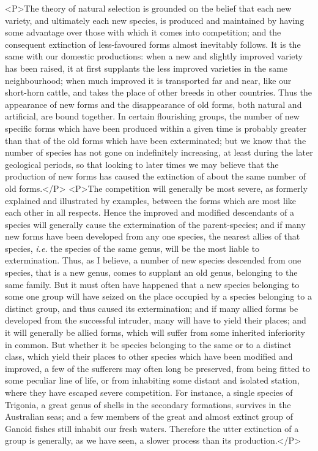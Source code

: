 <P>The theory of natural selection is grounded on the belief that each new variety, and ultimately each new species, is produced and maintained by having some advantage over those with which it comes into competition; and the consequent extinction of less-favoured forms almost inevitably follows.  It is the same with our domestic productions: when a new and slightly improved variety has been raised, it at first supplants the less improved varieties in the same neighbourhood; when much improved it is transported far and near, like our short-horn cattle, and takes the place of other breeds in other countries. Thus the appearance of new forms and the disappearance of old forms, both natural and artificial, are bound together. In certain flourishing groups, the number of new specific forms which have been produced within a given time is probably greater than that of the old forms which have been exterminated; but we know that the number of species has not gone on indefinitely increasing, at least during the later geological periods, so that looking to later times we may believe that the production of new forms has caused the extinction of about the same number of old forms.</P>
<P>The competition will generally be most severe, as formerly explained and illustrated by examples, between the forms which are most like each other in all respects. Hence the improved and modified descendants of a species will generally cause the extermination of the parent-species; and if many new forms have been developed from any one species, the nearest allies of that species, \emph{i.e.} the species of the same genus, will be the most liable to extermination. Thus, as I believe, a number of new species descended from one species, that is a new genus, comes to supplant an old genus, belonging to the same family. But it must often have happened that a new species belonging to some one group will have seized on the place occupied by a species belonging to a distinct group, and thus caused its extermination; and if many allied forms be developed from the successful intruder, many will have to yield their places; and it will generally be allied forms, which will suffer from some inherited inferiority in common. But whether it be species belonging to the same or to a distinct class, which yield their places to other species which have been modified and improved, a few of the sufferers may often long be preserved, from being fitted to some peculiar line of life, or from inhabiting some distant and isolated station, where they have escaped severe competition. For instance, a single species of Trigonia, a great genus of shells in the secondary formations, survives in the Australian seas; and a few members of the great and almost extinct group of Ganoid fishes still inhabit our fresh waters. Therefore the utter extinction of a group is generally, as we have seen, a slower process than its production.</P>
